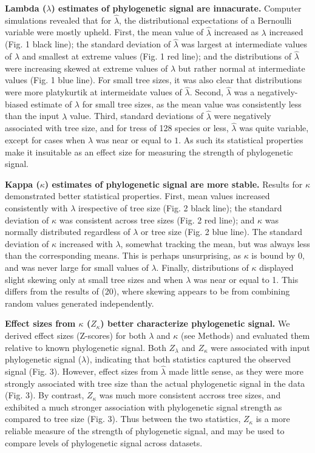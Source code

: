 \documentclass[
]{article}
\begin{document}
\textbf{Lambda (\(\lambda\)) estimates of phylogenetic signal are
innacurate.} Computer simulations revealed that for \(\hat{\lambda}\),
the distributional expectations of a Bernoulli variable were mostly
upheld. First, the mean value of \(\hat{\lambda}\) increased as
\(\lambda\) increased (Fig. 1 black line); the standard deviation of
\(\hat{\lambda}\) was largest at intermediate values of \(\lambda\) and
smallest at extreme values (Fig. 1 red line); and the distributions of
\(\hat{\lambda}\) were increasing skewed at extreme values of
\(\lambda\) but rather normal at intermediate values (Fig. 1 blue line).
For small tree sizes, it was also clear that distributions were more
platykurtik at intermeidate values of \(\hat{\lambda}\). Second,
\(\hat{\lambda}\) was a negatively-biased estimate of \(\lambda\) for
small tree sizes, as the mean value was consistently less than the input
\(\lambda\) value. Third, standard deviations of \(\hat{\lambda}\) were
negatively associated with tree size, and for tress of 128 species or
less, \(\hat{\lambda}\) was quite variable, except for cases when
\(\lambda\) was near or equal to \(1\). As such its statistical
properties make it insuitable as an effect size for measuring the
strength of phylogenetic signal. \hfill\break

\textbf{Kappa (\(\kappa\)) estimates of phylogenetic signal are more
stable.} Results for \(\kappa\) demonstrated better statistical
properties. First, mean values increased consistently with \(\lambda\)
irespective of tree size (Fig. 2 black line); the standard deviation of
\(\kappa\) was consistent across tree sizes (Fig. 2 red line); and
\(\kappa\) was normally distributed regardless of \(\lambda\) or tree
size (Fig. 2 blue line). The standard deviation of \(\kappa\) increased
with \(\lambda\), somewhat tracking the mean, but was always less than
the corresponding means. This is perhaps unsurprising, as \(\kappa\) is
bound by 0, and was never large for small values of \(\lambda\).
Finally, distributions of \(\kappa\) displayed slight skewing only at
small tree sizes and when \(\lambda\) was near or equal to 1. This
differs from the results of (20), where skewing appears to be from
combining random values generated independently. \hfill\break

\textbf{Effect sizes from \(\kappa\) (\(Z_{\kappa}\)) better
characterize phylogenetic signal.} We derived effect sizes (Z-scores)
for both \(\lambda\) and \(\kappa\) (see Methods) and evaluated them
relative to known phylogenetic signal. Both \(Z_{\lambda}\) and
\(Z_{\kappa}\) were associated with input phylogenetic signal
(\(\lambda\)), indicating that both statistics captured the observed
signal (Fig. 3). However, effect sizes from \(\hat{\lambda}\) made
little sense, as they were more strongly associated with tree size than
the actual phylogenetic signal in the data (Fig. 3). By contrast,
\(Z_{\kappa}\) was much more consistent accross tree sizes, and
exhibited a much stronger association with phylogenetic signal strength
as compared to tree size (Fig. 3). Thus between the two statistics,
\(Z_{\kappa}\) is a more reliable measure of the strength of
phylogenetic signal, and may be used to compare levels of phylogenetic
signal across datasets. \hfill\break
\end{document}
